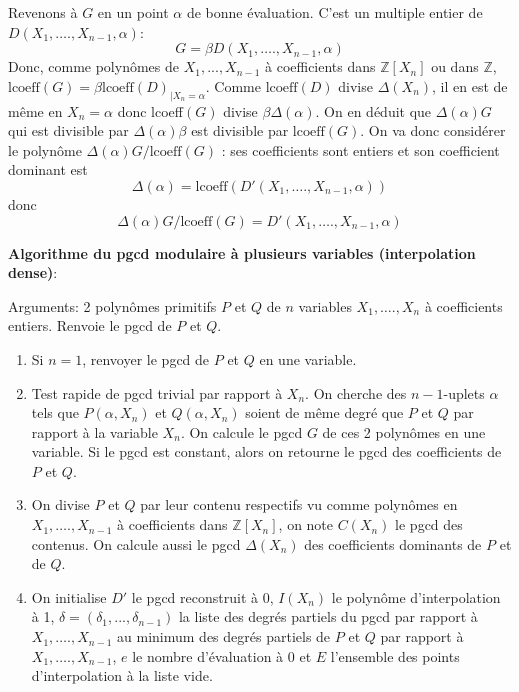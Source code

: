 \documentclass[a4paper,11pt]{article}
\begin{document}
\begin{giacjshere}
Revenons à $G$ en un point $\alpha$ de bonne évaluation. C'est un multiple
entier de $D ( X_1, \ldots ., X_{n - 1}, \alpha )$:
\[ G = \beta D ( X_1, \ldots ., X_{n - 1}, \alpha ) \]
Donc, comme polynômes de $X_1,...,X_{n-1}$ à coefficients dans 
$\mathbb{Z}[X_n]$ ou dans $\mathbb{Z}$,
$\mbox{lcoeff} ( G ) = \beta \mbox{lcoeff} ( D )_{| X_n = \alpha}$. Comme
$\mbox{lcoeff} ( D )$ divise $\Delta ( X_n )$, il en est de même en $X_n =
\alpha$ donc lcoeff$(G)$ divise $\beta \Delta(\alpha)$. 
On en déduit que $ \Delta ( \alpha) G$ qui 
est divisible par $ \Delta (\alpha) \beta$ est
divisible par $\mbox{lcoeff} ( G )$. On va donc considérer le polynôme
$ \Delta (\alpha) G  / \mbox{lcoeff} ( G )$ :
ses coefficients sont entiers et son coefficient dominant est  
$$\Delta ( \alpha) = \mbox{lcoeff}(D'( X_1, \ldots ., X_{n - 1}, \alpha ))$$
donc
\[ \Delta (\alpha) G  / \mbox{lcoeff} ( G )=
D'( X_1, \ldots ., X_{n - 1}, \alpha )\]

{\bf{Algorithme du pgcd modulaire à plusieurs variables (interpolation
dense)}}:

Arguments: 2 polynômes primitifs $P$ et $Q$ de $n$ variables $X_1, \ldots .,
X_n$ à coefficients entiers. Renvoie le pgcd de $P$ et $Q$.
\begin{enumerate}
  \item Si $n = 1$, renvoyer le pgcd de $P$ et $Q$ en une variable.
  
  \item Test rapide de pgcd trivial par rapport à $X_n$. On cherche des $n -
  1$-uplets $\alpha$ tels que $P ( \alpha, X_n )$ et $Q ( \alpha, X_n )$
  soient de même degré que $P$ et $Q$ par rapport à la variable $X_n$. On
  calcule le pgcd $G$ de ces 2 polynômes en une variable. Si le pgcd est
  constant, alors on retourne le pgcd des coefficients de $P$ et $Q$.
  
  \item On divise $P$ et $Q$ par leur contenu respectifs vu comme polynômes en
  $X_1, \ldots ., X_{n - 1}$ à coefficients dans $\mathbb{Z} [ X_n ]$, on note
  $C ( X_n )$ le pgcd des contenus. On calcule aussi le pgcd $\Delta ( X_n )$
  des coefficients dominants de $P$ et de $Q$.
  
  \item On initialise $D'$ le pgcd reconstruit à 0, $I ( X_n )$ le polynôme
  d'interpolation à 1, $\delta=(\delta_1,...,\delta_{n-1})$ 
  la liste des degrés partiels du pgcd par
  rapport à $X_1, \ldots ., X_{n - 1}$ au minimum des degrés partiels de $P$
  et $Q$ par rapport à $X_1, \ldots ., X_{n - 1}$, $e$ le nombre d'évaluation
  à 0 et $E$ l'ensemble des points d'interpolation à la liste vide.
  

\end{enumerate}
\end{giacjshere}
\end{document}
